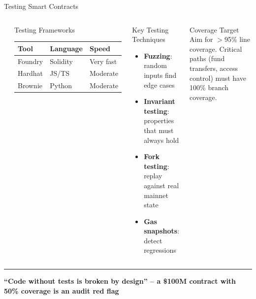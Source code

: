 \documentclass[8pt,aspectratio=169]{beamer}
\newcommand{\bottomnote}[1]{\vfill\vspace{-2mm}\textcolor{mllavender2}{\rule{\textwidth}{0.4pt}}\vspace{1mm}\footnotesize\textbf{#1}}
\begin{document}
\begin{frame}{Testing Smart Contracts}
\begin{columns}
\begin{center}
\end{center}
\begin{block}{Testing Frameworks}
\small
\begin{tabular}{@{}lll@{}}
\toprule
\textbf{Tool} & \textbf{Language} & \textbf{Speed} \\
\midrule
Foundry & Solidity & Very fast \\
Hardhat & JS/TS & Moderate \\
Brownie & Python & Moderate \\
\bottomrule
\end{tabular}
\end{block}
\vspace{1mm}
\begin{block}{Key Testing Techniques}
\begin{itemize}\small
  \item \textbf{Fuzzing}: random inputs find edge cases
  \item \textbf{Invariant testing}: properties that must always hold
  \item \textbf{Fork testing}: replay against real mainnet state
  \item \textbf{Gas snapshots}: detect regressions
\end{itemize}
\end{block}
\vspace{1mm}
\begin{alertblock}{Coverage Target}
\small Aim for $>$95\% line coverage. Critical paths (fund transfers, access control) must have 100\% branch coverage.
\end{alertblock}
\end{columns}
\bottomnote{``Code without tests is broken by design'' -- a \$100M contract with 50\% coverage is an audit red flag}
\end{frame}
\end{document}
